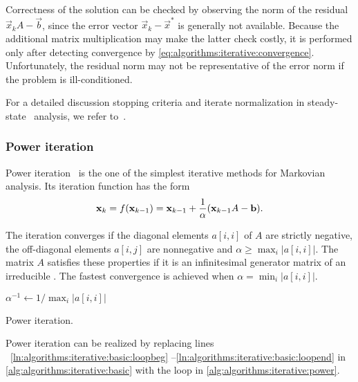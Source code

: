 Correctness of the solution can be checked by observing the norm of
the residual $\vec{x}_{k} A - \vec{b}$, since the error vector
$\vec{x}_k - \vec{x}^*$ is generally not available. Because the
additional matrix multiplication may make the latter check costly, it
is performed only after detecting convergence by
\vref{eq:algorithms:iterative:convergence}. Unfortunately, the
residual norm may not be representative of the error norm if the
problem is ill-conditioned.

For a detailed discussion stopping criteria and iterate normalization
in steady-state \CTMC\ analysis, we refer
to~\citep[Section~10.3.5]{stewart2009probability}.

\subsubsection{Power iteration}
\label{ssec:algorithms:power}

Power iteration~\citep[Section~10.3.1]{stewart2009probability} is the
one of the simplest iterative methods for Markovian analysis. Its
iteration function has the form
\begin{equation}
  \vec{x}_k = f(\vec{x}_{k - 1}) = \vec{x}_{k - 1} + \frac{1}{\alpha} \mleft(
  \vec{x}_{k - 1} A - \vec{b} \mright) \text.
\end{equation}

The iteration converges if the diagonal elements $a[i,i]$ of $A$ are
strictly negative, the off-diagonal elements $a[i,j]$ are nonnegative
and $\alpha \ge \max_{i} \lvert a[i,i] \rvert$. The matrix $A$
satisfies these properties if it is an infinitesimal generator matrix
of an irreducible \CTMC. The fastest convergence is achieved when
$\alpha = \min_{i} \lvert a[i,i] \rvert$.

\begin{algorithm}
  $\alpha^{-1} \gets 1 / \max_{i} \lvert a[i,i] \rvert$\;
  \caption{Power iteration.}
  \label{alg:algorithms:iterative:power}
\end{algorithm}

Power iteration can be realized by replacing lines%
~\ref{ln:algorithms:iterative:basic:loopbeg}%
--\ref{ln:algorithms:iterative:basic:loopend} in
\vref{alg:algorithms:iterative:basic} with the loop in
\vref{alg:algorithms:iterative:power}.

